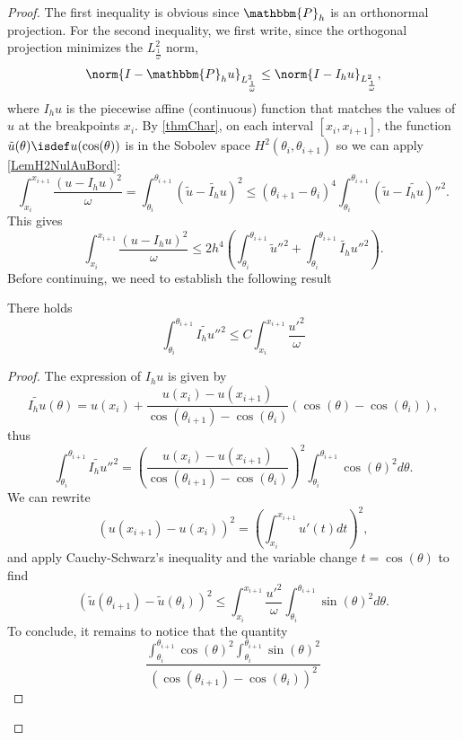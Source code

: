 \documentclass[a4paper]{article}
\begin{document}
\begin{proof}
	The first inequality is obvious since $\mathbbm{P}_h$ is an orthonormal projection. For the second inequality, we first write, since the orthogonal projection minimizes the $L^2_\frac{1}{\omega}$ norm,
	\begin{equation}
		\norm{I - \mathbbm{P}_h u}_{L^2_\frac{1}{\omega}} \leq \norm{I - I_h u}_{L^2_\frac{1}{\omega}},
		\label{estimProjParInterp}
	\end{equation}
	where $I_h u$ is the piecewise affine (continuous) function that matches the values of $u$ at the breakpoints $x_i$. By \autoref{thmChar}, on each interval $[x_i, x_{i+1}]$, the function $\tilde{u}(\theta) \isdef u(\cos(\theta))$ is in the Sobolev space $H^2(\theta_i,\theta_{i+1})$ so we can apply \autoref{LemH2NulAuBord}:
	\[ \int_{x_i}^{x_{i+1}} \frac{(u - I_h u)^2}{\omega} = \int_{\theta_i}^{\theta_{i+1}} (\tilde{u}- \tilde{I_h}u)^2 \leq (\theta_{i+1} - \theta_i)^4 \int_{\theta_{i}}^{\theta_{i+1}} (\tilde{u} - \tilde{I_hu})''^2. \]
	This gives
	\begin{equation}
		\int_{x_i}^{x_{i+1}} \frac{(u - I_h u)^2}{\omega} \leq 2h^4 \left(\int_{\theta_i}^{\theta_{i+1}} \tilde{u}''^2 + \int_{\theta_i}^{\theta_{i+1}} \tilde{I_h}u''^2 \right).
		\label{enCoursDePreuve}
	\end{equation}
	Before continuing, we need to establish the following result
	\begin{Lem}
		There holds 
		\[ \int_{\theta_i}^{\theta_{i+1}} \tilde{I_hu}''^2 \leq C \int_{x_i}^{x_{i+1}} \frac{u'^2}{\omega}\]
	\end{Lem}
	\begin{proof}
		The expression of $I_h u$ is given by
		\[\tilde{I_h u}(\theta) = u(x_i) + \frac{u(x_i) - u(x_{i+1})}{\cos(\theta_{i+1}) - \cos(\theta_i)} (\cos(\theta) - \cos(\theta_i)),\]
		thus
		\[\int_{\theta_i}^{\theta_{i+1}} \tilde{I_hu}''^2 = \left(\frac{u(x_i) - u(x_{i+1})}{\cos(\theta_{i+1}) - \cos(\theta_i)}\right)^2 \int_{\theta_i}^{\theta_{i+1}} \cos(\theta)^2 d\theta.\]
		We can rewrite 
		\[\left(u(x_{i+1}) - u(x_i)\right)^2 = \left( \int_{x_i}^{x_{i+1}} u'(t)dt\right)^2,\]
		and apply Cauchy-Schwarz's inequality and the variable change $t = \cos(\theta)$ to find 
		\[\left(\tilde{u}(\theta_{i+1}) - \tilde{u}(\theta_i)\right)^2 \leq \int_{x_i}^{x_{i+1}} \frac{u'^2}{\omega} \int_{\theta_i}^{\theta_{i+1}} \sin(\theta)^2 d\theta.\]
		To conclude, it remains to notice that the quantity
			\[\frac{ \int_{\theta_i}^{\theta_{i+1}} \cos(\theta)^2\int_{\theta_i}^{\theta_{i+1}} \sin(\theta)^2}{(\cos(\theta_{i+1}) - \cos(\theta_i))^2}\]

\end{proof}
\end{proof}
\end{document}
